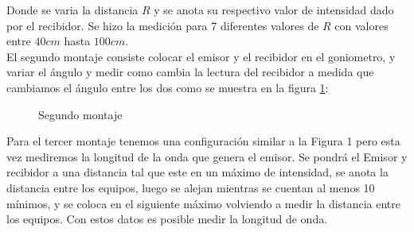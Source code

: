 \documentclass[aps,prl,reprint]{revtex4-1}
\begin{document}
Donde se varia la distancia $R$ y se anota su respectivo valor de intensidad dado por el recibidor. Se hizo la medición para 7 diferentes valores de $R$ con valores entre $40 cm$ hasta $100 cm$. \\


El segundo montaje consiste colocar el emisor y el recibidor en el goniometro, y variar el ángulo y medir como cambia la lectura del recibidor a medida que cambiamos el ángulo entre los dos como se muestra en la figura \ref{monta2}:\\
\begin{figure}[H]
\begin{center}
 \caption{Segundo montaje}
 \label{monta2}
 \end{center}
\end{figure}

Para el tercer montaje tenemos una configuración similar a la Figura 1 pero esta vez mediremos la longitud de la onda que genera el emisor. Se pondrá el Emisor y recibidor a una distancia tal que este en un máximo de intensidad, se anota la distancia entre los equipos, luego se alejan mientras se cuentan al menos 10 mínimos, y se coloca en el siguiente máximo  volviendo a medir la distancia entre los equipos. Con estos datos es posible medir la longitud de onda.
\\
\end{document}
